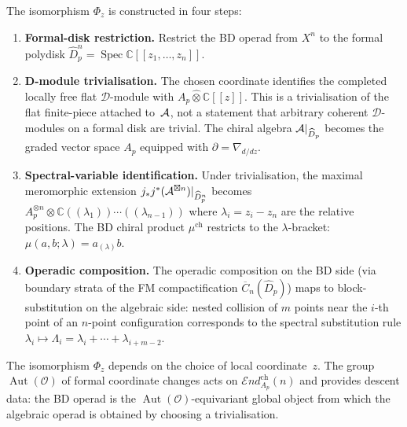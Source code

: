 \begin{proposition}
The isomorphism $\Phi_z$ is constructed in four steps:
\begin{enumerate}[label=\textup{Step~\arabic*.},leftmargin=*]
\item \textbf{Formal-disk restriction.}
 Restrict the BD operad from $X^n$ to the formal
 polydisk $\widehat{D}_p^n = \operatorname{Spec} \mathbb{C}[[z_1, \ldots, z_n]]$.
\item \textbf{D-module trivialisation.}
 The chosen coordinate identifies the completed locally free
 flat $\mathcal D$-module with
 $A_p\widehat{\otimes}\mathbb{C}[[z]]$. This is a trivialisation
 of the flat finite-piece attached to~$\mathcal{A}$, not a statement that
 arbitrary coherent $\mathcal D$-modules on a formal disk are
 trivial. The chiral algebra $\mathcal{A}|_{\widehat{D}_p}$ becomes the
 graded vector space $A_p$ equipped with
 $\partial = \nabla_{d/dz}$.
\item \textbf{Spectral-variable identification.}
 Under trivialisation, the maximal meromorphic extension
 $j_* j^*(\mathcal{A}^{\boxtimes n})|_{\widehat{D}_p^n}$ becomes
 $A_p^{\otimes n} \otimes
 \mathbb{C}((\lambda_1))\cdots((\lambda_{n-1}))$
 where $\lambda_i = z_i - z_n$ are the relative positions.
 The BD chiral product $\mu^{\mathrm{ch}}$ restricts to the
 $\lambda$-bracket: $\mu(a, b; \lambda) = a_{(\lambda)} b$.
\item \textbf{Operadic composition.}
 The operadic composition on the BD side (via boundary strata
 of the FM compactification $\overline{C}_n(\widehat{D}_p)$) maps
 to block-substitution on the algebraic side: nested collision
 of $m$ points near the $i$-th point of an $n$-point
 configuration corresponds to the spectral substitution rule
 $\lambda_i \mapsto \Lambda_i = \lambda_i + \cdots +
 \lambda_{i+m-2}$.
\end{enumerate}
The isomorphism $\Phi_z$ depends on the choice of local
coordinate~$z$. The group $\operatorname{Aut}(\mathcal{O})$ of formal coordinate
changes acts on $\mathcal{E}\!\mathit{nd}^{\mathrm{ch}}_{A_p}(n)$ and
provides descent data: the BD operad is the
$\operatorname{Aut}(\mathcal{O})$-equivariant global object from which the algebraic
operad is obtained by choosing a trivialisation.
\end{proposition}

